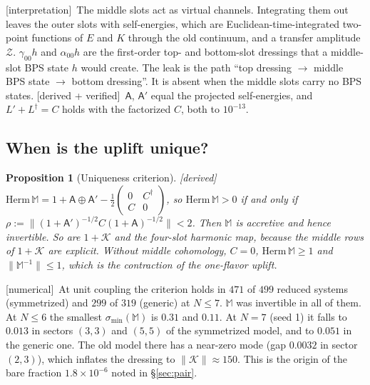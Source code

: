 \documentclass[11pt]{article}
\newcommand{\Zc}{\mathcal Z}
\newcommand{\Kc}{\mathcal K}
\newcommand{\Mb}{\mathbb M}
\newcommand{\tagbox}[2]{\textsf{\small\color{#1}[#2]}}
\newcommand{\DER}{\tagbox{cder}{derived}}
\newcommand{\VER}{\tagbox{cder}{derived + verified}}
\newcommand{\NUM}{\tagbox{cnum}{numerical}}
\newcommand{\INTERP}{\tagbox{cconj}{interpretation}}
\theoremstyle{plain}
\newtheorem{proposition}{Proposition}
\theoremstyle{remark}
\numberwithin{equation}{section}
\begin{document}
\INTERP\ The middle slots act as virtual channels. Integrating them out leaves the outer slots with self-energies,
which are Euclidean-time-integrated two-point functions of $E$ and $K$ through the old continuum, and a transfer
amplitude $\Zc$. $\gamma_{00}h$ and $\alpha_{00}h$ are the first-order top- and bottom-slot dressings that a middle-slot
BPS state $h$ would create. The leak is the path ``top dressing $\to$ middle BPS state $\to$ bottom dressing''. It is
absent when the middle slots carry no BPS states. \VER\ $\mathsf A$, $\mathsf A'$ equal the projected self-energies,
and $L'+L^\dagger=C$ holds with the factorized $C$, both to $10^{-13}$.

\subsection{When is the uplift unique?}\label{sec:unique}

\begin{proposition}[Uniqueness criterion]\label{prop:unique}\DER\
$\mathrm{Herm}\,\Mb=1+\mathsf A\oplus\mathsf A'-\tfrac12\begin{pmatrix}0&C^\dagger\\C&0\end{pmatrix}$, so
$\mathrm{Herm}\,\Mb>0$ if and only if
$\rho:=\|(1+\mathsf A')^{-1/2}C(1+\mathsf A)^{-1/2}\|<2$. Then $\Mb$ is accretive and hence invertible. So are
$1+\Kc$ and the four-slot harmonic map, because the middle rows of $1+\Kc$ are explicit. Without middle cohomology,
$C=0$, $\mathrm{Herm}\,\Mb\ge1$ and $\|\Mb^{-1}\|\le1$, which is the contraction of the one-flavor uplift.
\end{proposition}

\NUM\ At unit coupling the criterion holds in $471$ of $499$ reduced systems (symmetrized) and $299$ of $319$ (generic)
at $N\le7$. $\Mb$ was invertible in all of them. At $N\le6$ the smallest $\sigma_{\min}(\Mb)$ is $0.31$ and $0.11$. At
$N=7$ (seed 1) it falls to $0.013$ in sectors $(3,3)$ and $(5,5)$ of the symmetrized model, and to $0.051$ in the generic
one. The old model there has a near-zero mode
(gap $0.0032$ in sector $(2,3)$), which inflates the dressing to $\|\Kc\|\approx150$. This is the origin of the bare
fraction $1.8\times10^{-6}$ noted in \S\ref{sec:pair}.
\end{document}
